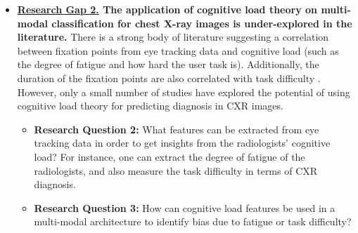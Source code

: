 \begin{itemize}
    \item  \textbf{\underline{Research Gap 2.} The application of cognitive load theory on multi-modal classification for chest X-ray images is under-explored in the literature.} 
    There is a strong body of literature suggesting a correlation between fixation points from eye tracking data and cognitive load (such as the degree of fatigue and how hard the user task is). Additionally, the duration of the fixation points are also correlated with task difficulty \citep{Palinko2010EyeTrackingCognitiveLoad-1, Zagermann2016EyeTrackingCognitiveLoad-2, Wang2014EyeTrackingCognitiveLoad-3, Krejtz2018EyeTrackingCognitiveLoad-4,Klingner2010EyeTrackingCognitiveLoad-5}. However, only a small number of studies have explored the potential of using cognitive load theory for predicting diagnosis in CXR images.
          \begin{itemize}
              \item \textbf{Research Question 2:} What features can be extracted from eye tracking data in order to get insights from the radiologists' cognitive load? For instance, one can extract the degree of fatigue of the radiologists, and also measure the task difficulty in terms of CXR diagnosis.
              \item \textbf{Research Question 3:} How can cognitive load features be used in a multi-modal architecture to identify bias due to fatigue or task difficulty?
          \end{itemize}
              

\end{itemize}
